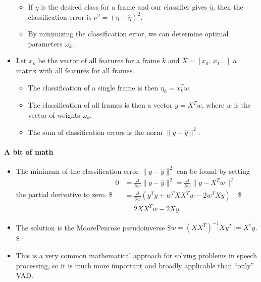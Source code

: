 \documentclass[letterpaper,10pt,english]{jupyterBook}
\begin{document}
\begin{itemize}
\begin{itemize}
\item {} 
\sphinxAtStartPar
If \(\eta\) is the desired class for a frame and our classifier
gives \(\hat\eta\), then the classification error is
\(\nu^2 = (\eta -\hat\eta)^2\).

\item {} 
\sphinxAtStartPar
By minimizing the classification error, we can determine optimal
parameters \(\omega_k\).

\end{itemize}

\item {} 
\sphinxAtStartPar
Let \(x_k\) be the vector of all features for a frame \(k\) and
\(X=[x_0,\,x_1\dots]\) a matrix with all features for all frames.
\begin{itemize}
\item {} 
\sphinxAtStartPar
The classification of a single frame is then \(\eta_k=x_k^Tw\).

\item {} 
\sphinxAtStartPar
The classification of all frames is then a vector \(y=X^Tw\),
where \(w\) is the vector of weights \(\omega_k\).

\item {} 
\sphinxAtStartPar
The sum of classification errors is the norm \(\|y-\hat y\|^2\).

\end{itemize}

\end{itemize}

\sphinxAtStartPar
{}


\paragraph{A bit of math}
\label{\detokenize{Recognition/Voice_activity_detection:a-bit-of-math}}\begin{itemize}
\item {} 
\sphinxAtStartPar
The minimum of the classification error \(\|y-\hat y\|^2\) can be
found by setting the partial derivative to zero. \$\(\begin{split}
      0 &= \frac\partial{\partial w}\|y-\hat y\|^2
      = \frac\partial{\partial w}\|y-X^Tw\|^2
      \\&
      = \frac\partial{\partial w}(y^Ty+w^TXX^Tw-2w^TXy)
      \\&
      =2XX^Tw - 2Xy.
    \end{split}\)\$

\item {} 
\sphinxAtStartPar
The solution is the Moore\sphinxhyphen{}Penrose pseudo\sphinxhyphen{}inverse
\$\(w = (XX^T)^{-1}Xy^T := X^\dagger y.\)\$

\item {} 
\sphinxAtStartPar
{} This is a very common mathematical approach for solving
problems in speech processing, so it is much more important and
broadly applicable than “only” VAD.

\end{itemize}
\end{document}
